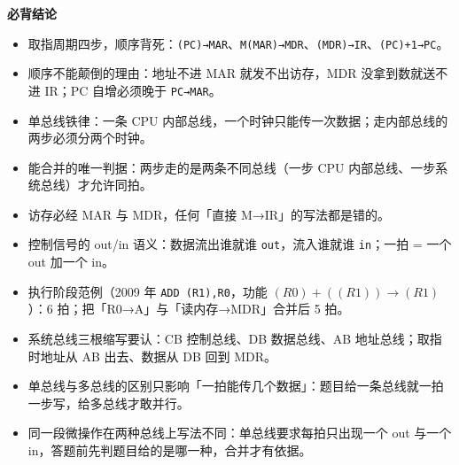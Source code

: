 \documentclass[10pt,a4paper]{ctexart}
\begin{document}



\textbf{必背结论}

\begin{itemize}

\item 取指周期四步，顺序背死：\texttt{(PC)→MAR}、\texttt{M(MAR)→MDR}、\texttt{(MDR)→IR}、\texttt{(PC)+1→PC}。

\item 顺序不能颠倒的理由：地址不进 MAR 就发不出访存，MDR 没拿到数就送不进 IR；PC 自增必须晚于 \texttt{PC→MAR}。

\item 单总线铁律：一条 CPU 内部总线，一个时钟只能传一次数据；走内部总线的两步必须分两个时钟。

\item 能合并的唯一判据：两步走的是两条不同总线（一步 CPU 内部总线、一步系统总线）才允许同拍。

\item 访存必经 MAR 与 MDR，任何「直接 M→IR」的写法都是错的。

\item 控制信号的 out/in 语义：数据流出谁就谁 \texttt{out}，流入谁就谁 \texttt{in}；一拍 = 一个 out 加一个 in。

\item 执行阶段范例（2009 年 \texttt{ADD (R1),R0}，功能 $(R0)+((R1))\to(R1)$）：6 拍；把「R0→A」与「读内存→MDR」合并后 5 拍。

\item 系统总线三根缩写要认：CB 控制总线、DB 数据总线、AB 地址总线；取指时地址从 AB 出去、数据从 DB 回到 MDR。

\item 单总线与多总线的区别只影响「一拍能传几个数据」：题目给一条总线就一拍一步写，给多总线才敢并行。

\item 同一段微操作在两种总线上写法不同：单总线要求每拍只出现一个 out 与一个 in，答题前先判题目给的是哪一种，合并才有依据。

\end{itemize}

\end{document}

